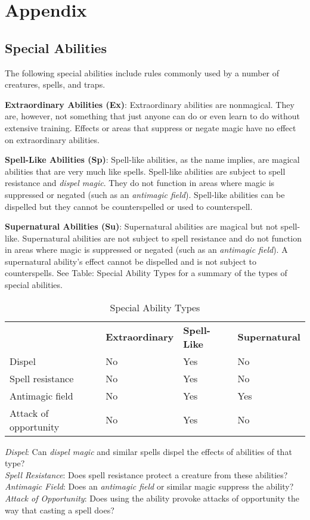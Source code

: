 \chapter{Appendix}
\section{Special Abilities}

\label{f0}				
The following special abilities include rules commonly used by a number of creatures, spells, and traps.
				
\textbf{Extraordinary Abilities (Ex)}: Extraordinary abilities are nonmagical. They are, however, not something that just anyone can do or even learn to do without extensive training. Effects or areas that suppress or negate magic have no effect on extraordinary abilities.
				
\textbf{Spell-Like Abilities (Sp)}: Spell-like abilities, as the name implies, are magical abilities that are very much like spells. Spell-like abilities are subject to spell resistance and \textit{dispel magic}. They do not function in areas where magic is suppressed or negated (such as an \textit{antimagic field}). Spell-like abilities can be dispelled but they cannot be counterspelled or used to counterspell.
				
\textbf{Supernatural Abilities (Su)}: Supernatural abilities are magical but not spell-like. Supernatural abilities are not subject to spell resistance and do not function in areas where magic is suppressed or negated (such as an \textit{antimagic field}). A supernatural ability's effect cannot be dispelled and is not subject to counterspells. See Table: Special Ability Types for a summary of the types of special abilities.


\begin{table}[]
\sffamily
\caption{Special Ability Types}
\begin{tabular}{llll}
\textbf{}             & \textbf{Extraordinary} & \textbf{Spell-Like} & \textbf{Supernatural} \\
Dispel                & No                     & Yes                 & No                    \\
Spell resistance      & No                     & Yes                 & No                    \\
Antimagic field       & No                     & Yes                 & Yes                   \\
Attack of opportunity & No                     & Yes                 & No                   
\end{tabular}
\textit{Dispel}: Can \textit{dispel magic }and similar spells dispel the effects of abilities of that type?\\
\textit{Spell Resistance}: Does spell resistance protect a creature from these abilities?\\
\textit{Antimagic Field}: Does an \textit{antimagic field }or similar magic suppress the ability?\\
\textit{Attack of Opportunity}: Does using the ability provoke attacks of opportunity the way that casting a spell does?\\
\end{table}
						
